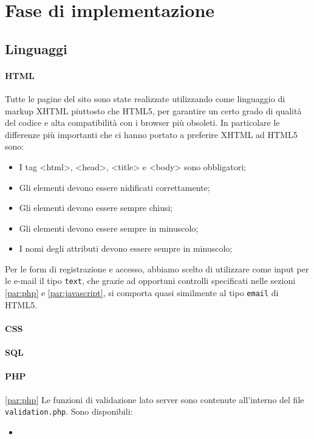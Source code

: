 \section{Fase di implementazione}
\label{sec:fase_di_implementazione}
\subsection{Linguaggi}
\paragraph{HTML}
Tutte le pagine del sito sono state realizzate utilizzando come linguaggio di markup XHTML piuttosto che HTML5, per garantire un certo grado di qualità del codice e alta compatibilità con i browser più obsoleti. In particolare le differenze più importanti che ci hanno portato a preferire XHTML ad HTML5 sono:
\begin{itemize}
    \item I tag <html>, <head>, <title> e <body> sono obbligatori;
    \item Gli elementi devono essere nidificati correttamente;
    \item Gli elementi devono essere sempre chiusi;
    \item Gli elementi devono essere sempre in minuscolo;
    \item I nomi degli attributi devono essere sempre in minuscolo;
\end{itemize}
Per le form di registrazione e accesso, abbiamo scelto di utilizzare come input per le e-mail il tipo \texttt{text}, che grazie ad opportuni controlli specificati nelle sezioni \ref{par:php} e \ref{par:javascript}, si comporta quasi similmente al tipo \texttt{email} di HTML5. %

\paragraph{CSS}

\paragraph{SQL}

\paragraph{PHP}\ref{par:php}
Le funzioni di validazione lato server sono contenute all'interno del file \texttt{validation.php}. Sono disponibili:
\begin{itemize}
	\item 
\end{itemize}

